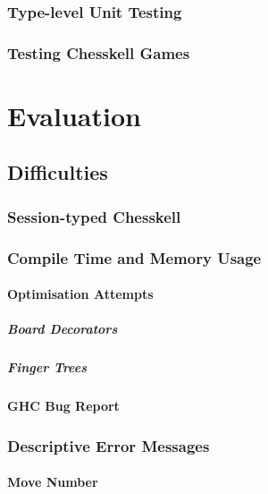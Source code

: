 \documentclass[12pt, a4paper, bibliography=totocnumbered]{scrreprt}
\begin{document}
\section{Type-level Unit Testing}

\section{Testing Chesskell Games}


\part{Evaluation}

\chapter{Difficulties}

\section{Session-typed Chesskell}

\section{Compile Time and Memory Usage}

\subsection{Optimisation Attempts}

\subsubsection{Board Decorators}

\subsubsection{Finger Trees}

\subsection{GHC Bug Report}

\section{Descriptive Error Messages}

\subsection{Move Number}
\end{document}
